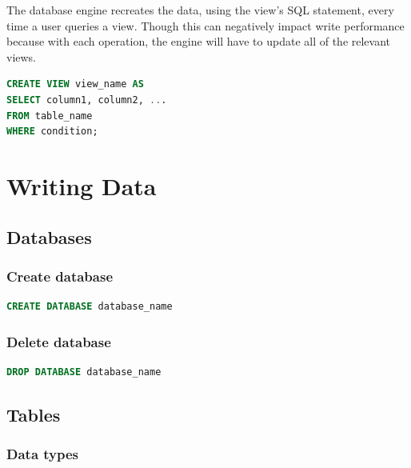 \documentclass{article}
\begin{document}
The database engine recreates the data, using the view's SQL statement, every time a user queries a view. Though this can negatively impact write performance because with each operation, the engine will have to update all of the relevant views.

\vspace{8pt} \begin{lstlisting}[language=SQL]
CREATE VIEW view_name AS
SELECT column1, column2, ...
FROM table_name
WHERE condition;
\end{lstlisting}

\newpage
\section{Writing Data}

\subsection{Databases}
\subsubsection{Create database}

\vspace{8pt} \begin{lstlisting}[language=SQL]
CREATE DATABASE database_name
\end{lstlisting} \vspace{8pt}

\subsubsection{Delete database}
\vspace{8pt} \begin{lstlisting}[language=SQL]
DROP DATABASE database_name
\end{lstlisting} \vspace{8pt}

\subsection{Tables}
\subsubsection{Data types}
\end{document}
